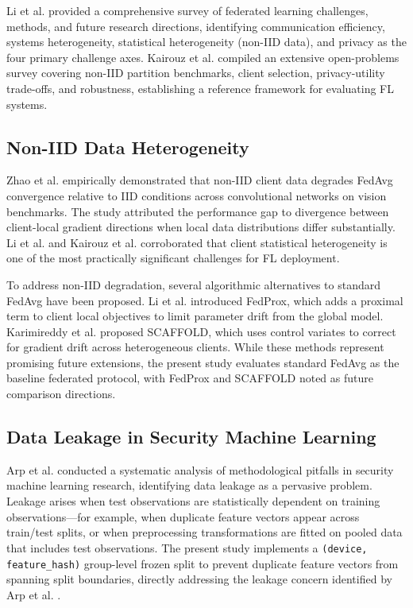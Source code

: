 \documentclass[11pt,a4paper]{article}
\begin{document}
Li et al. \cite{ref6} provided a comprehensive survey of federated learning challenges, methods, and future research directions, identifying communication efficiency, systems heterogeneity, statistical heterogeneity (non-IID data), and privacy as the four primary challenge axes. Kairouz et al. \cite{ref7} compiled an extensive open-problems survey covering non-IID partition benchmarks, client selection, privacy-utility trade-offs, and robustness, establishing a reference framework for evaluating FL systems.

\subsection{Non-IID Data Heterogeneity}
Zhao et al. \cite{ref5} empirically demonstrated that non-IID client data degrades FedAvg convergence relative to IID conditions across convolutional networks on vision benchmarks. The study attributed the performance gap to divergence between client-local gradient directions when local data distributions differ substantially. Li et al. \cite{ref6} and Kairouz et al. \cite{ref7} corroborated that client statistical heterogeneity is one of the most practically significant challenges for FL deployment.

To address non-IID degradation, several algorithmic alternatives to standard FedAvg have been proposed. Li et al. \cite{ref9} introduced FedProx, which adds a proximal term to client local objectives to limit parameter drift from the global model. Karimireddy et al. \cite{ref10} proposed SCAFFOLD, which uses control variates to correct for gradient drift across heterogeneous clients. While these methods represent promising future extensions, the present study evaluates standard FedAvg as the baseline federated protocol, with FedProx and SCAFFOLD noted as future comparison directions.

\subsection{Data Leakage in Security Machine Learning}
Arp et al. \cite{ref8} conducted a systematic analysis of methodological pitfalls in security machine learning research, identifying data leakage as a pervasive problem. Leakage arises when test observations are statistically dependent on training observations—for example, when duplicate feature vectors appear across train/test splits, or when preprocessing transformations are fitted on pooled data that includes test observations. The present study implements a \texttt{(device, feature\_hash)} group-level frozen split to prevent duplicate feature vectors from spanning split boundaries, directly addressing the leakage concern identified by Arp et al. \cite{ref8}.
\end{document}
